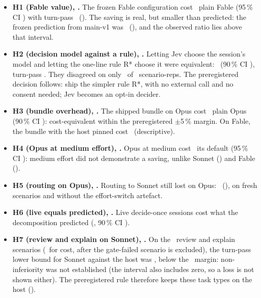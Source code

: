 \begin{itemize}
  \item \textbf{H1 (Fable value), \SHOneVerdict.} The frozen Fable configuration cost \SHOneRatio\X\ plain Fable (95\,\% CI
    \SHOneCI) with turn-pass \SHOneDtp\ (\SHOneDtpCI). The saving is real, but smaller than predicted: the frozen
    prediction from main-v1 was \SPredRatio\ (\SPredCI), and the observed ratio lies above that interval.
  \item \textbf{H2 (decision model against a rule), \SHTwoVerdict.} Letting Jev choose the session's model and letting
    the one-line rule R* choose it were equivalent: \SHTwoRatio\X\ (90\,\% CI \SHTwoCINinety), turn-pass \SHTwoDtp. They
    disagreed on only \SHTwoDisc\ of \SHTwoReps\ scenario-reps. The preregistered decision follows: ship the simpler rule
    R*, with no external call and no consent needed; Jev becomes an opt-in decider.
  \item \textbf{H3 (bundle overhead), \SHThreeVerdict.} The shipped bundle on Opus cost \SHThreeRatio\X\ plain Opus (90\,\%
    CI \SHThreeCINinety): cost-equivalent within the preregistered $\pm$5\,\% margin. On Fable, the bundle with the host pinned cost \SHThreeBRatio\X\ (descriptive).
  \item \textbf{H4 (Opus at medium effort), \SHFourVerdict.} Opus at medium cost \SHFourRatio\X\ its default (95\,\% CI
    \SHFourCI): medium effort did not demonstrate a saving, unlike Sonnet (\EcRatio\X) and Fable (\EfRatio\X).
  \item \textbf{H5 (routing on Opus), \SHFiveVerdict.} Routing to Sonnet still lost on Opus: \SHFiveRatio\X\ (\SHFiveCI),
    on fresh scenarios and without the effort-switch artefact.
  \item \textbf{H6 (live equals predicted), \SHSixVerdict.} Live decide-once sessions cost what the decomposition predicted
    (\SHSixRatio\X, 90\,\% CI \SHSixCINinety).
  \item \textbf{H7 (review and explain on Sonnet), \SHSevenVerdict.} On the \SHSevenQualN\ review and explain scenarios
    (\SHSevenN\ for cost, after the gate-failed scenario is excluded), the turn-pass lower bound for Sonnet against the host was \SHSevenDtpLow, below the \NIMargin\ margin: non-inferiority was not
    established (the interval also includes zero, so a loss is not shown either). The preregistered
    rule therefore keeps these task types on the host ().
\end{itemize}

